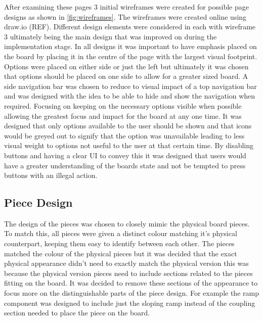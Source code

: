 \documentclass{l4proj}
\begin{document}
After examining these pages 3 initial wireframes were created for possible page designs as shown in \ref{fig:wireframes}. The wireframes were created online using draw.io (REF). Different design elements were considered in each with wireframe 3 ultimately being the main design that was improved on during the implementation stage. In all designs it was important to have emphasis placed on the board by placing it in the centre of the page with the largest visual footprint. Options were placed on either side or just the left but ultimately it was chosen that options should be placed on one side to allow for a greater sized board. A side navigation bar was chosen to reduce to visual impact of a top navigation bar and was designed with the idea to be able to hide and show the navigation when required. Focusing on keeping on the necessary options visible when possible allowing the greatest focus and impact for the board at any one time. It was designed that only options available to the user should be shown and that icons would be greyed out to signify that the option was unavailable leading to less visual weight to options not useful to the user at that certain time. By disabling buttons and having a clear UI to convey this it was designed that users would have a greater understanding of the boards state and not be tempted to press buttons with an illegal action.


\subsection{Piece Design}
The design of the pieces was chosen to closely mimic the physical board pieces. To match this, all pieces were given a distinct colour matching it's physical counterpart, keeping them easy to identify between each other. The pieces matched the colour of the physical pieces but it was decided that the exact physical appearance didn't need to exactly match the physical version this was because the physical version pieces need to include sections related to the pieces fitting on the board. It was decided to remove these sections of the appearance to focus more on the distinguishable parts of the piece design. For example the ramp component was designed to include just the sloping ramp instead of the coupling section needed to place the piece on the board.
\end{document}
